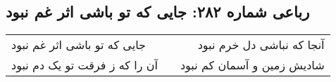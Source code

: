 \begin{center}
\section*{رباعی شماره ۲۸۲: جایی که تو باشی اثر غم نبود}
\label{sec:sh282}
\begin{longtable}{l p{0.5cm} r}
جایی که تو باشی اثر غم نبود
&&
آنجا که نباشی دل خرم نبود
\\
آن را که ز فرقت تو یک دم نبود
&&
شادیش زمین و آسمان کم نبود
\\
\end{longtable}
\end{center}
